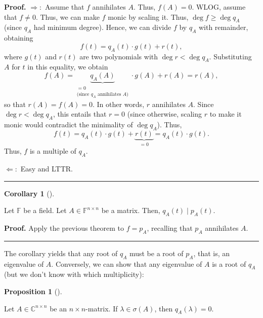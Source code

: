 \documentclass[numbers=enddot,12pt,final,onecolumn,notitlepage]{scrartcl}%
\numberwithin{exer}{subsection}
\theoremstyle{definition}
\newtheorem{prop}[theo]{Proposition}
\newenvironment{proposition}[1][]
{\begin{prop}[#1]\begin{leftbar}}
{\end{leftbar}\end{prop}}
\newtheorem{coro}[theo]{Corollary}
\newenvironment{corollary}[1][]
{\begin{coro}[#1]\begin{leftbar}}
{\end{leftbar}\end{coro}}
\newenvironment{proof}[1][Proof]{\noindent\textbf{#1.} }{\ \rule{0.5em}{0.5em}}
\begin{document}
\begin{proof}
$\Longrightarrow:$ Assume that $f$ annihilates $A$. Thus, $f\left(  A\right)
=0$. WLOG, assume that $f\neq0$. Thus, we can make $f$ monic by scaling it.
Thus, $\deg f\geq\deg q_{A}$ (since $q_{A}$ had minimum degree). Hence, we can
divide $f$ by $q_{A}$ with remainder, obtaining%
\[
f\left(  t\right)  =q_{A}\left(  t\right)  \cdot g\left(  t\right)  +r\left(
t\right)  ,
\]
where $g\left(  t\right)  $ and $r\left(  t\right)  $ are two polynomials with
$\deg r<\deg q_{A}$. Substituting $A$ for $t$ in this equality, we obtain%
\[
f\left(  A\right)  =\underbrace{q_{A}\left(  A\right)  }%
_{\substack{=0\\\text{(since }q_{A}\text{ annihilates }A\text{)}}}\cdot
g\left(  A\right)  +r\left(  A\right)  =r\left(  A\right)  ,
\]
so that $r\left(  A\right)  =f\left(  A\right)  =0$. In other words, $r$
annihilates $A$. Since $\deg r<\deg q_{A}$, this entails that $r=0$ (since
otherwise, scaling $r$ to make it monic would contradict the minimality of
$\deg q_{A}$). Thus,%
\[
f\left(  t\right)  =q_{A}\left(  t\right)  \cdot g\left(  t\right)
+\underbrace{r\left(  t\right)  }_{=0}=q_{A}\left(  t\right)  \cdot g\left(
t\right)  .
\]
Thus, $f$ is a multiple of $q_{A}$.

$\Longleftarrow:$ Easy and LTTR.
\end{proof}

\begin{corollary}
\label{cor.jnf.mipo.div-charpol}Let $\mathbb{F}$ be a field. Let
$A\in\mathbb{F}^{n\times n}$ be a matrix. Then, $q_{A}\left(  t\right)  \mid
p_{A}\left(  t\right)  $.
\end{corollary}

\begin{proof}
Apply the previous theorem to $f=p_{A}$, recalling that $p_{A}$ annihilates
$A$.
\end{proof}

The corollary yields that any root of $q_{A}$ must be a root of $p_{A}$, that
is, an eigenvalue of $A$. Conversely, we can show that any eigenvalue of $A$
is a root of $q_{A}$ (but we don't know with which multiplicity):

\begin{proposition}
\label{prop.jnf.mipo.qlam=0}Let $A\in\mathbb{C}^{n\times n}$ be an $n\times
n$-matrix. If $\lambda\in\sigma\left(  A\right)  $, then $q_{A}\left(
\lambda\right)  =0$.
\end{proposition}
\end{document}
